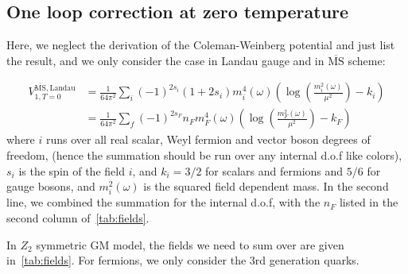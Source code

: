 \documentclass[12pt]{article}
\begin{document}
\subsection{One loop correction at zero temperature}

Here, we neglect the derivation of the Coleman-Weinberg potential and just list the result, and we only consider the case in Landau gauge and in $\overline{\text{MS}}$ scheme:

\begin{align}
    V_{1,T=0}^{\overline{\text{MS}},\text{Landau}} &= \frac{1}{64\pi^2}\sum_i(-1)^{2s_i}(1+2s_i)m_i^4(\omega)\left(\log\left(\frac{m_i^2(\omega)}{\mu^2}\right)-k_i\right) \nonumber\\
    &=\frac{1}{64\pi^2}\sum_f(-1)^{2s_F}n_Fm_F^4(\omega)\left(\log\left(\frac{m_F^2(\omega)}{\mu^2}\right)-k_F\right)
\end{align}
where $i$ runs over all real scalar, Weyl fermion and vector boson degrees of freedom, (hence the summation should be run over any internal d.o.f like colors), $s_i$ is the spin of the field $i$, and $k_i = 3/2$ for scalars and fermions and $5/6$ for gauge bosons, and $m_i^2(\omega)$ is the squared field dependent mass. In the second line, we combined the summation for the internal d.o.f, with the $n_F$ listed in the second column of~\autoref{tab:fields}.

In $Z_2$ symmetric GM model, the fields we need to sum over are given in~\autoref{tab:fields}. For fermions, we only consider the 3rd generation quarks.
\end{document}
